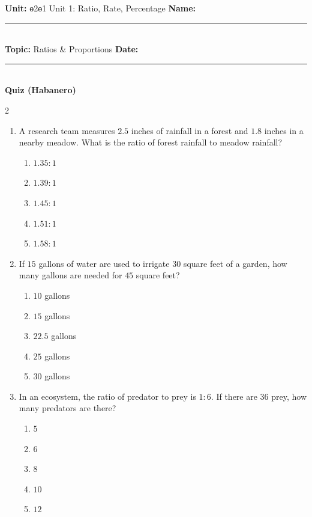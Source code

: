 \documentclass[10pt]{article}
\begin{document}
\enlargethispage{2.5cm}

\begin{tcolorbox}[colback=mainblue!5, colframe=mainblue, sharp corners, boxrule=0.5pt]
    \small \textbf{Unit:} ɵ2ɵ1 Unit 1: Ratio, Rate, Percentage \hfill \textbf{Name:} \rule{3cm}{0.4pt} \\
    \small \textbf{Topic:} Ratios & Proportions \hfill \textbf{Date:} \rule{2cm}{0.4pt} \\
    \centering \textbf{\large Quiz (Habanero)}
\end{tcolorbox}

\vspace{0.2cm}

\begin{multicols}{2}
\begin{enumerate}[label=\textbf{Q\arabic*.}, leftmargin=*, itemsep=6pt, parsep=0pt]

  \item \small A research team measures $2.5$ inches of rainfall in a forest and $1.8$ inches in a nearby meadow. What is the ratio of forest rainfall to meadow rainfall?
  \begin{enumerate}[label=(\Alph*), leftmargin=0.6cm, nosep, itemsep=2pt]
    \item $1.35:1$
    \item $1.39:1$
    \item $1.45:1$
    \item $1.51:1$
    \item $1.58:1$
  \end{enumerate}

  \item \small If $15$ gallons of water are used to irrigate $30$ square feet of a garden, how many gallons are needed for $45$ square feet?
  \begin{enumerate}[label=(\Alph*), leftmargin=0.6cm, nosep, itemsep=2pt]
    \item $10$ gallons
    \item $15$ gallons
    \item $22.5$ gallons
    \item $25$ gallons
    \item $30$ gallons
  \end{enumerate}

  \item \small In an ecosystem, the ratio of predator to prey is $1:6$. If there are $36$ prey, how many predators are there?
  \begin{enumerate}[label=(\Alph*), leftmargin=0.6cm, nosep, itemsep=2pt]
    \item $5$
    \item $6$
    \item $8$
    \item $10$
    \item $12$
  \end{enumerate}


\end{enumerate}
\end{multicols}
\end{document}
